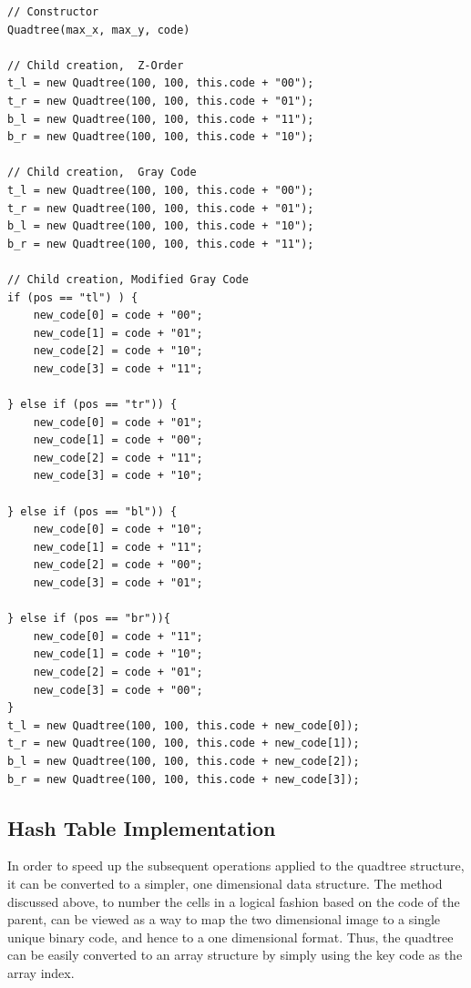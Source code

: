 \begin{lstlisting}[caption={Code to generate children of the current quadtree
while maintaining the correct ordering.},label=code:child_construction]
// Constructor
Quadtree(max_x, max_y, code)

// Child creation,  Z-Order
t_l = new Quadtree(100, 100, this.code + "00");
t_r = new Quadtree(100, 100, this.code + "01");
b_l = new Quadtree(100, 100, this.code + "11");
b_r = new Quadtree(100, 100, this.code + "10");

// Child creation,  Gray Code
t_l = new Quadtree(100, 100, this.code + "00");
t_r = new Quadtree(100, 100, this.code + "01");
b_l = new Quadtree(100, 100, this.code + "10");
b_r = new Quadtree(100, 100, this.code + "11");

// Child creation, Modified Gray Code
if (pos == "tl") ) {
	new_code[0] = code + "00";
	new_code[1] = code + "01";
	new_code[2] = code + "10";
	new_code[3] = code + "11";

} else if (pos == "tr")) {
	new_code[0] = code + "01";
	new_code[1] = code + "00";
	new_code[2] = code + "11";
	new_code[3] = code + "10";

} else if (pos == "bl")) {
	new_code[0] = code + "10";
	new_code[1] = code + "11";
	new_code[2] = code + "00";
	new_code[3] = code + "01";

} else if (pos == "br")){
	new_code[0] = code + "11";
	new_code[1] = code + "10";
	new_code[2] = code + "01";
	new_code[3] = code + "00";
}
t_l = new Quadtree(100, 100, this.code + new_code[0]);
t_r = new Quadtree(100, 100, this.code + new_code[1]);
b_l = new Quadtree(100, 100, this.code + new_code[2]);
b_r = new Quadtree(100, 100, this.code + new_code[3]);
\end{lstlisting}

\subsection{Hash Table Implementation}
\label{sub:hash_table_implementation}

In order to speed up the subsequent operations applied to the quadtree
structure, it can be converted to a simpler, one dimensional data structure.
The method discussed above, to number the cells in a logical fashion based on
the code of the parent, can be viewed as a way to map the two dimensional image
to a single unique binary code, and hence to a one dimensional format. Thus,
the quadtree can be easily converted to an array structure by simply using the
key code as the array index.

